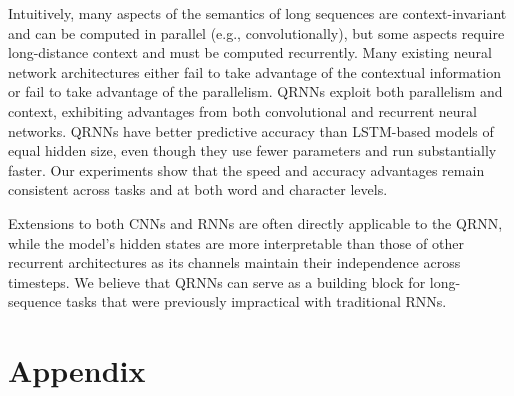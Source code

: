 \documentclass{article} %
\begin{document}
Intuitively, many aspects of the semantics of long sequences are context-invariant and can be computed in parallel (e.g., convolutionally), but some aspects require long-distance context and must be computed recurrently. Many existing neural network architectures either fail to take advantage of the contextual information or fail to take advantage of the parallelism.
QRNNs exploit both parallelism and context, exhibiting advantages from both convolutional and recurrent neural networks.
QRNNs have better predictive accuracy than LSTM-based models of equal hidden size, even though they use fewer parameters and run substantially faster.
Our experiments show that the speed and accuracy advantages remain consistent across tasks and at both word and character levels.

Extensions to both CNNs and RNNs are often directly applicable to the QRNN, while the model's hidden states are more interpretable than those of other recurrent architectures as its channels maintain their independence across timesteps.
We believe that QRNNs can serve as a building block for long-sequence tasks that were previously impractical with traditional RNNs.




\setcounter{figure}{0}
\renewcommand{\thefigure}{A\arabic{figure}}


\clearpage
\section*{Appendix}
\end{document}

